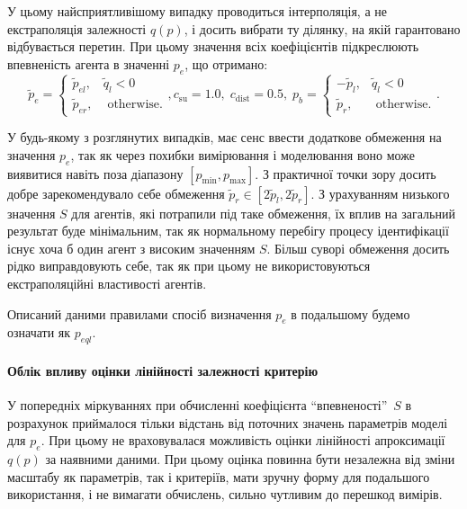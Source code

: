 У цьому найсприятливішому випадку проводиться інтерполяція, а не екстраполяція
залежності $q(p)$, і досить вибрати ту ділянку, на якій гарантовано
відбувається перетин. При цьому значення всіх коефіцієнтів підкреслюють
впевненість агента в значенні $p_e$, що отримано:
%
\begin{equation}
  \tilde{p}_e
  =
  \begin{cases}
    \tilde{p}_{el}, & \tilde{q}_l < 0
    \\
    \tilde{p}_{er}, & \text{ otherwise}.
  \end{cases}
  ,
  c_\mathrm{su} = 1.0, \;  c_\mathrm{dist} = 0.5,  \;
  p_b =
  \begin{cases}
    -\tilde{p}_l, & \tilde{q}_l < 0
    \\
    \tilde{p}_r, & \text{ otherwise}.
  \end{cases}.
  \label{atu:eq:pr_e4}
\end{equation}

У будь-якому з розглянутих випадків, має сенс ввести додаткове обмеження на
значення $p_e$, так як через похибки вимірювання і моделювання воно може
виявитися навіть поза діапазону $[p_{\min}, p_{\max}]$. З практичної
точки зору досить добре зарекомендувало себе обмеження
$\tilde {p}_r \in [2 \tilde{p}_l, 2 \tilde{p}_r]$.
З урахуванням низького значення $S$ для
агентів, які потрапили під таке обмеження, їх вплив на загальний результат буде
мінімальним, так як нормальному перебігу процесу ідентифікації існує хоча б
один агент з високим значенням $S$. Більш суворі обмеження досить рідко
виправдовують себе, так як при цьому не використовуються екстраполяційні
властивості агентів.

Описаний даними правилами спосіб визначення $p_e$ в подальшому будемо
означати як $p_{eql}$\label{atu:d:p_eql}.

\paragraph{Облік впливу оцінки лінійності залежності критерію}

У попередніх міркуваннях при обчисленні коефіцієнта
``впевненості''~$S$ в розрахунок приймалося тільки відстань від поточних значень
параметрів моделі для
$ p_e $. При цьому не враховувалася можливість оцінки лінійності
апроксимації
$q(p)$ за наявними даними. При цьому оцінка повинна бути незалежна
від зміни масштабу як параметрів, так і критеріїв, мати зручну
форму для подальшого використання, і не вимагати обчислень,
сильно чутливим до перешкод вимірів.

